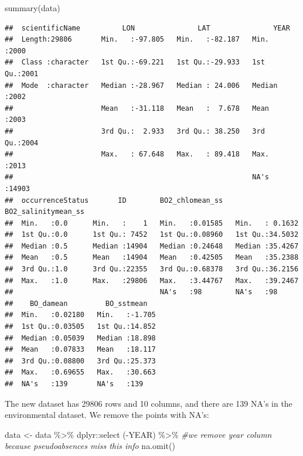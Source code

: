 \documentclass[
]{book}
\newenvironment{Shaded}{\begin{snugshade}}{\end{snugshade}}
\newcommand{\CommentTok}[1]{\textcolor[rgb]{0.56,0.35,0.01}{\textit{#1}}}
\newcommand{\FunctionTok}[1]{\textcolor[rgb]{0.00,0.00,0.00}{#1}}
\newcommand{\NormalTok}[1]{#1}
\newcommand{\OtherTok}[1]{\textcolor[rgb]{0.56,0.35,0.01}{#1}}
\newcommand{\SpecialCharTok}[1]{\textcolor[rgb]{0.00,0.00,0.00}{#1}}
\begin{document}
\begin{Shaded}
\begin{Highlighting}[]
\FunctionTok{summary}\NormalTok{(data)}
\end{Highlighting}
\end{Shaded}

\begin{verbatim}
##  scientificName          LON               LAT               YEAR      
##  Length:29806       Min.   :-97.805   Min.   :-82.187   Min.   :2000   
##  Class :character   1st Qu.:-69.221   1st Qu.:-29.933   1st Qu.:2001   
##  Mode  :character   Median :-28.967   Median : 24.006   Median :2002   
##                     Mean   :-31.118   Mean   :  7.678   Mean   :2003   
##                     3rd Qu.:  2.933   3rd Qu.: 38.250   3rd Qu.:2004   
##                     Max.   : 67.648   Max.   : 89.418   Max.   :2013   
##                                                         NA's   :14903  
##  occurrenceStatus       ID        BO2_chlomean_ss   BO2_salinitymean_ss
##  Min.   :0.0      Min.   :    1   Min.   :0.01585   Min.   : 0.1632    
##  1st Qu.:0.0      1st Qu.: 7452   1st Qu.:0.08960   1st Qu.:34.5032    
##  Median :0.5      Median :14904   Median :0.24648   Median :35.4267    
##  Mean   :0.5      Mean   :14904   Mean   :0.42505   Mean   :35.2388    
##  3rd Qu.:1.0      3rd Qu.:22355   3rd Qu.:0.68378   3rd Qu.:36.2156    
##  Max.   :1.0      Max.   :29806   Max.   :3.44767   Max.   :39.2467    
##                                   NA's   :98        NA's   :98         
##    BO_damean         BO_sstmean    
##  Min.   :0.02180   Min.   :-1.705  
##  1st Qu.:0.03505   1st Qu.:14.852  
##  Median :0.05039   Median :18.898  
##  Mean   :0.07833   Mean   :18.117  
##  3rd Qu.:0.08800   3rd Qu.:25.373  
##  Max.   :0.69655   Max.   :30.663  
##  NA's   :139       NA's   :139
\end{verbatim}

The new dataset has 29806 rows and 10 columns, and there are 139 NA's in the environmental dataset. We remove the points with NA's:

\begin{Shaded}
\begin{Highlighting}[]
\NormalTok{data }\OtherTok{\textless{}{-}}\NormalTok{ data }\SpecialCharTok{\%\textgreater{}\%} 
\NormalTok{  dplyr}\SpecialCharTok{::}\FunctionTok{select}\NormalTok{ (}\SpecialCharTok{{-}}\NormalTok{YEAR) }\SpecialCharTok{\%\textgreater{}\%} \CommentTok{\#we remove year column because pseudoabsences miss this info}
  \FunctionTok{na.omit}\NormalTok{()}
\end{Highlighting}
\end{Shaded}
\end{document}
